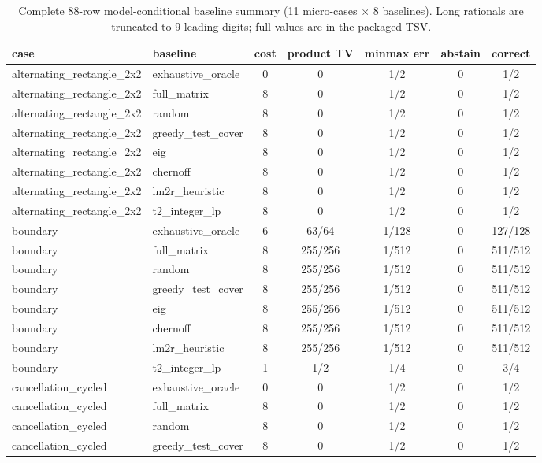 \begin{table}[p]
\centering
\small
\setlength{\tabcolsep}{3pt}
\caption{Complete 88-row model-conditional baseline summary (11 micro-cases $\times$ 8 baselines). Long rationals are truncated to 9 leading digits; full values are in the packaged TSV.\label{tab:supp88}}
\begin{tabular}{@{}llccccc@{}}
\toprule
case & baseline & cost & product TV & minmax err & abstain & correct \\
\midrule
alternating\_rectangle\_2x2 & exhaustive\_oracle & 0 & 0 & 1/2 & 0 & 1/2 \\
alternating\_rectangle\_2x2 & full\_matrix & 8 & 0 & 1/2 & 0 & 1/2 \\
alternating\_rectangle\_2x2 & random & 8 & 0 & 1/2 & 0 & 1/2 \\
alternating\_rectangle\_2x2 & greedy\_test\_cover & 8 & 0 & 1/2 & 0 & 1/2 \\
alternating\_rectangle\_2x2 & eig & 8 & 0 & 1/2 & 0 & 1/2 \\
alternating\_rectangle\_2x2 & chernoff & 8 & 0 & 1/2 & 0 & 1/2 \\
alternating\_rectangle\_2x2 & lm2r\_heuristic & 8 & 0 & 1/2 & 0 & 1/2 \\
alternating\_rectangle\_2x2 & t2\_integer\_lp & 8 & 0 & 1/2 & 0 & 1/2 \\
boundary & exhaustive\_oracle & 6 & 63/64 & 1/128 & 0 & 127/128 \\
boundary & full\_matrix & 8 & 255/256 & 1/512 & 0 & 511/512 \\
boundary & random & 8 & 255/256 & 1/512 & 0 & 511/512 \\
boundary & greedy\_test\_cover & 8 & 255/256 & 1/512 & 0 & 511/512 \\
boundary & eig & 8 & 255/256 & 1/512 & 0 & 511/512 \\
boundary & chernoff & 8 & 255/256 & 1/512 & 0 & 511/512 \\
boundary & lm2r\_heuristic & 8 & 255/256 & 1/512 & 0 & 511/512 \\
boundary & t2\_integer\_lp & 1 & 1/2 & 1/4 & 0 & 3/4 \\
cancellation\_cycled & exhaustive\_oracle & 0 & 0 & 1/2 & 0 & 1/2 \\
cancellation\_cycled & full\_matrix & 8 & 0 & 1/2 & 0 & 1/2 \\
cancellation\_cycled & random & 8 & 0 & 1/2 & 0 & 1/2 \\
cancellation\_cycled & greedy\_test\_cover & 8 & 0 & 1/2 & 0 & 1/2 \\

\end{tabular}
\end{table}

